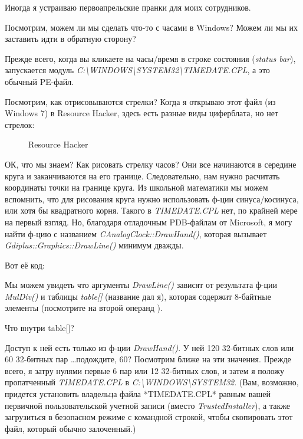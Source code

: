 
Иногда я устраиваю первоапрельские пранки для моих сотрудников.

Посмотрим, можем ли мы сделать что-то с часами в Windows?
Можем ли мы их заставить идти в обратную сторону?

Прежде всего, когда вы кликаете на часы/время в строке состояния (\emph{status bar}),\\
запускается модуль \emph{C:\textbackslash{}WINDOWS\textbackslash{}SYSTEM32\textbackslash{}TIMEDATE.CPL},
а это обычный \ac{PE}-файл.

Посмотрим, как отрисовываются стрелки?
Когда я открываю этот файл (из Windows 7) в Resource Hacker, здесь есть разные виды циферблата, но нет стрелок:

\begin{figure}[H]
\centering
{}
\caption{Resource Hacker}
\end{figure}

ОК, что мы знаем? Как рисовать стрелку часов? Они все начинаются в середине круга и заканчиваются на его границе.
Следовательно, нам нужно расчитать координаты точки на границе круга.
Из школьной математики мы можем вспомнить, что для рисования круга нужно использовать ф-ции синуса/косинуса, или
хотя бы квадратного корня.
Такого в \emph{TIMEDATE.CPL} нет, по крайней мере на первый взгляд.
Но, благодаря отладочным PDB-файлам от Microsoft, я могу найти ф-цию с названием \emph{CAnalogClock::DrawHand()}, которая
вызывает \emph{Gdiplus::Graphics::DrawLine()} минимум дважды.

Вот её код:



Мы можем увидеть что аргументы \emph{DrawLine()} зависят от результата ф-ции \emph{MulDiv()}
и таблицы \emph{table[]} (название дал я),
которая содержит 8-байтные элементы (посмотрите на второй операнд ).

Что внутри table[]?



Доступ к ней есть только из ф-ции \emph{DrawHand()}.
У ней 120 32-битных слов или 60 32-битных пар \dots подождите, 60?
Посмотрим ближе на эти значения.
Прежде всего, я затру нулями первые 6 пар или 12 32-битных слов, и затем я положу пропатченный \emph{TIMEDATE.CPL}
в \emph{C:\textbackslash{}WINDOWS\textbackslash{}SYSTEM32}.
(Вам, возможно, придется установить владельца файла *TIMEDATE.CPL* равным вашей первичной пользовательской учетной
записи (вместо \emph{TrustedInstaller}),
а также загрузиться в безопасном режиме с командной строкой, чтобы скопировать этот файл, который обычно залоченный.)

